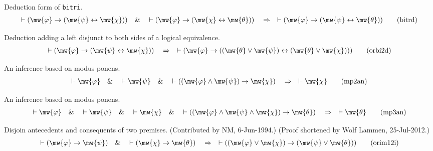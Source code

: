 \begin{lemma} Deduction form of {\tt bitri}. 
\begin{align}
\vdash ( \mw{\varphi} \rightarrow ( \mw{\psi} \leftrightarrow \mw{\chi} )
    )\quad\&\quad \vdash ( \mw{\varphi} \rightarrow ( \mw{\chi} \leftrightarrow
    \mw{\theta} ) )\quad\Rightarrow\quad \vdash ( \mw{\varphi} \rightarrow (
    \mw{\psi} \leftrightarrow \mw{\theta} ) )\label{eq:bitrd}\tag{bitrd}
\end{align}
\end{lemma}


\begin{lemma} Deduction adding a left disjunct to both
sides of a logical equivalence.
\begin{align}
\vdash ( \mw{\varphi} \rightarrow ( \mw{\psi} \leftrightarrow \mw{\chi} )
    )\quad\Rightarrow\quad \vdash ( \mw{\varphi} \rightarrow ( ( \mw{\theta}
    \vee \mw{\psi} ) \leftrightarrow ( \mw{\theta} \vee \mw{\chi} ) )
    )\label{eq:orbi2d}\tag{orbi2d}
\end{align}
\end{lemma}


\begin{lemma} An inference based on modus ponens. 
\begin{align}
\vdash \mw{\varphi}\quad\&\quad \vdash \mw{\psi}\quad\&\quad \vdash ( (
    \mw{\varphi} \wedge \mw{\psi} ) \rightarrow \mw{\chi}
    )\quad\Rightarrow\quad \vdash \mw{\chi}\label{eq:mp2an}\tag{mp2an}
\end{align}
\end{lemma}


\begin{lemma} An inference based on modus ponens. 
\begin{align}
\vdash \mw{\varphi}\quad\&\quad \vdash \mw{\psi}\quad\&\quad \vdash
    \mw{\chi}\quad\&\quad \vdash ( ( \mw{\varphi} \wedge \mw{\psi} \wedge
    \mw{\chi} ) \rightarrow \mw{\theta} )\quad\Rightarrow\quad \vdash
    \mw{\theta}\label{eq:mp3an}\tag{mp3an}
\end{align}
\end{lemma}


\begin{lemma} Disjoin antecedents and consequents of two
premises.  (Contributed by
       NM, 6-Jun-1994.)  (Proof shortened by Wolf Lammen, 25-Jul-2012.)
\begin{align}
\vdash ( \mw{\varphi} \rightarrow \mw{\psi} )\quad\&\quad \vdash ( \mw{\chi}
    \rightarrow \mw{\theta} )\quad\Rightarrow\quad \vdash ( ( \mw{\varphi} \vee
    \mw{\chi} ) \rightarrow ( \mw{\psi} \vee \mw{\theta} )
    )\label{eq:orim12i}\tag{orim12i}
\end{align}
\end{lemma}


